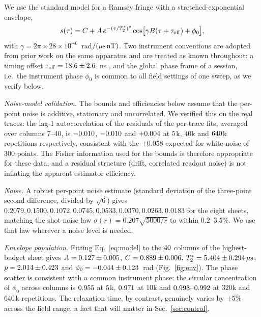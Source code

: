 \documentclass[aps,pra,twocolumn,superscriptaddress,nofootinbib]{revtex4-2}
\newcommand{\mus}{\,\mu\mathrm{s}}
\begin{document}
We use the standard model for a Ramsey fringe with a stretched-exponential envelope,
\begin{equation}
s(\tau)=C+A\,e^{-(\tau/T_2^{*})^{p}}\cos\!\big[\gamma B(\tau+\tau_{\rm off})+\phi_0\big],
\label{eq:model}
\end{equation}
with $\gamma=2\pi\times28\times10^{-6}$~rad$/(\mu{\rm s}\,{\rm nT})$. Two instrument
conventions are adopted from prior work on the same apparatus and are treated as known
throughout: a timing offset $\tau_{\rm off}=18.6\pm2.6$~ns
\cite{L1companion}, and the global phase frame of a session, i.e.\ the instrument phase
$\phi_0$ is common to all field settings of one sweep, as we verify below.

\emph{Noise-model validation.} The bounds and efficiencies below assume that the per-point
noise is additive, stationary and uncorrelated. We verified this on the real traces: the
lag-1 autocorrelation of the residuals of the per-trace fits, averaged over columns 7--40,
is $-0.010$, $-0.010$ and $+0.004$ at $5$k, $40$k and
$640$k repetitions respectively, consistent with the $\pm0.058$ expected for white noise
of $300$ points. The Fisher information used for the bounds is therefore appropriate for
these data, and a residual structure (drift, correlated readout noise) is not inflating the
apparent estimator efficiency.

\emph{Noise.} A robust per-point noise estimate (standard deviation of the three-point
second difference, divided by $\sqrt 6$) gives $0.2079,0.1500,0.1072,0.0745,0.0533,0.0370,
0.0263,0.0183$ for the eight sheets, matching the shot-noise law
$\sigma(r)=0.207\sqrt{5000/r}$ to within $0.2$--$3.5\%$. We use that law wherever a noise
level is needed.

\emph{Envelope population.} Fitting Eq.~\eqref{eq:model} to the $40$ columns of the
highest-budget sheet gives $A=0.127\pm0.005$, $C=0.889\pm0.006$,
$T_2^{*}=\envTstarMean\pm\envTstarStd\mus$, $p=2.014\pm0.423$ and
$\phi_0=-0.044\pm0.123$~rad (Fig.~\ref{fig:env}). The phase scatter is consistent
with a common instrument phase: the circular concentration of $\phi_0$ across columns is
$0.955$ at $5$k, $0.971$ at $10$k and $0.993$--$0.992$ at $320$k and $640$k
repetitions. The relaxation time, by contrast, genuinely varies by $\pm5\%$ across the
field range, a fact that will matter in Sec.~\ref{sec:control}.
\end{document}
